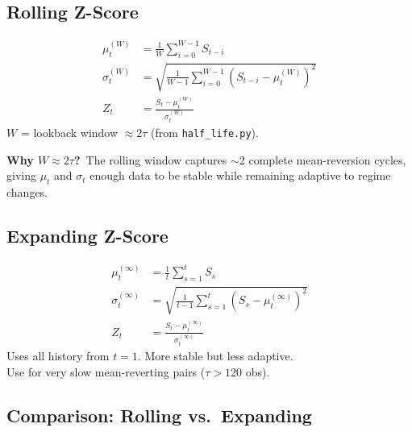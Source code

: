 \documentclass[10pt,a4paper,twocolumn]{article}
\begin{document}
\subsection{Rolling Z-Score}

\begin{tcolorbox}[mathbox={Formula 1 --- Rolling Z-Score}]
\vspace{-4pt}
\begin{align}
  \mu_t^{(W)} &= \frac{1}{W}\sum_{i=0}^{W-1} S_{t-i}
  \label{eq:rolling_mu}\\
  \sigma_t^{(W)} &= \sqrt{\frac{1}{W-1}\sum_{i=0}^{W-1}(S_{t-i}-\mu_t^{(W)})^2}
  \label{eq:rolling_sigma}\\
  Z_t &= \frac{S_t - \mu_t^{(W)}}{\sigma_t^{(W)}}
  \label{eq:zscore}
\end{align}
\vspace{-4pt}
$W$ = lookback window $\approx 2\tau$ (from \texttt{half\_life.py}).
\end{tcolorbox}

\noindent\textbf{Why $W \approx 2\tau$?}~The rolling window captures
$\sim$2 complete mean-reversion cycles, giving $\mu_t$ and $\sigma_t$
enough data to be stable while remaining adaptive to regime changes.

\subsection{Expanding Z-Score}

\begin{tcolorbox}[mathbox={Formula 2 --- Expanding Z-Score}]
\vspace{-4pt}
\begin{align}
  \mu_t^{(\infty)} &= \frac{1}{t}\sum_{s=1}^{t} S_s \\
  \sigma_t^{(\infty)} &= \sqrt{\frac{1}{t-1}\sum_{s=1}^{t}(S_s - \mu_t^{(\infty)})^2} \\
  Z_t &= \frac{S_t - \mu_t^{(\infty)}}{\sigma_t^{(\infty)}}
\end{align}
\vspace{-4pt}
Uses all history from $t=1$.  More stable but less adaptive.\\
Use for very slow mean-reverting pairs ($\tau > 120$ obs).
\end{tcolorbox}

\subsection{Comparison: Rolling vs.\ Expanding}
\end{document}
